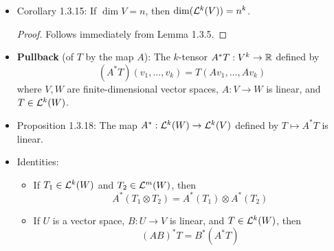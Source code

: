 \documentclass[../notes.tex]{subfiles}
\begin{document}
\begin{itemize}
\begin{proof}
    \end{proof}
    \item Corollary 1.3.15: If $\dim V=n$, then $\dim(\lin[k]{V})=n^k$.
    \begin{proof}
        Follows immediately from Lemma 1.3.5.
    \end{proof}
    \item \textbf{Pullback} (of $T$ by the map $A$): The $k$-tensor $A^*T:V^k\to\R$ defined by
    \begin{equation*}
        (A^*T)(v_1,\dots,v_k) = T(Av_1,\dots,Av_k)
    \end{equation*}
    where $V,W$ are finite-dimensional vector spaces, $A:V\to W$ is linear, and $T\in\lin[k]{W}$.
    \item Proposition 1.3.18: The map $A^*:\lin[k]{W}\to\lin[k]{V}$ defined by $T\mapsto A^*T$ is linear.
    \item Identities:
    \begin{itemize}
        \item If $T_1\in\lin[k]{W}$ and $T_2\in\lin[m]{W}$, then
        \begin{equation*}
            A^*(T_1\otimes T_2) = A^*(T_1)\otimes A^*(T_2)
        \end{equation*}
        \item If $U$ is a vector space, $B:U\to V$ is linear, and $T\in\lin[k]{W}$, then
        \begin{equation*}
            (AB)^*T = B^*(A^*T)
        \end{equation*}
    \end{itemize}
\end{itemize}
\end{document}
